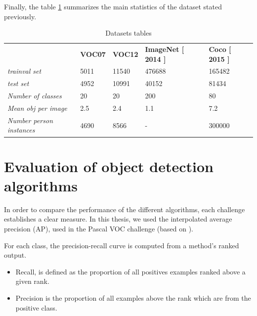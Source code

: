 Finally, the table \ref{dataset0} summarizes the main statistics of the dataset stated previously.

\begin{table}[H]
\centering

\begin{tabular}{lllll}
                                 & \textbf{VOC07} & \textbf{VOC12} & \textbf{ImageNet [ 2014 ]} & \textbf{Coco [ 2015 ]} \\
\textit{trainval set}            & 5011           & 11540          & 476688                     & 165482                 \\
\textit{test set}                & 4952           & 10991          & 40152                      & 81434                  \\
\textit{Number of classes}       & 20             & 20             & 200                        & 80                     \\
\textit{Mean obj per image}      & 2.5            & 2.4            & 1.1                        & 7.2                    \\
\textit{Number person instances} & 4690           & 8566           & -                          & 300000                
\end{tabular}
\caption{Datasets tables}
\label{dataset0}
\end{table}


\section{Evaluation of object detection algorithms}

In order to compare the performance of the different algorithms, each challenge establishes a clear measure. In this thesis, we used the interpolated average precision (AP), used in the Pascal VOC challenge (based on \cite{salton}).

For each class, the precision-recall curve is computed from a method's ranked output.

\begin{itemize}

\item Recall, is defined as the proportion of all positives examples ranked above a given rank.

\item Precision is the proportion of all examples above the rank which are from the positive class.

\end{itemize}


